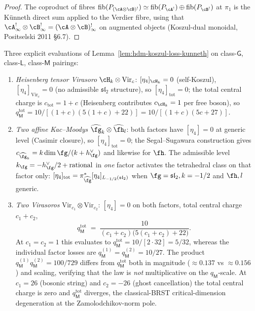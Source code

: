 \begin{proof}
The coproduct of fibres
$\mathrm{fib}(P_{(\cA\otimes\cB)^!}) \simeq
\mathrm{fib}(P_{\cA^!})\oplus\mathrm{fib}(P_{\cB^!})$ at $\pi_1$
is the K\"unneth direct sum applied to the Verdier fibre, using
that $\cA^!_\infty\otimes\cB^!_\infty = (\cA\otimes\cB)^!_\infty$
on augmented objects (Koszul-dual monoidal, Positselski
\textup{2011 §6.7}).
\end{proof}

\begin{example}
\label{ex:hdm-koszul-loss-kunneth-examples}
Three explicit evaluations of
Lemma~\ref{lem:hdm-koszul-loss-kunneth} on class-$\mathsf G$,
class-$\mathsf L$, class-$\mathsf M$ pairings:
\begin{enumerate}[label=\textup{(\roman*)}]
\item \emph{Heisenberg tensor Virasoro}
$\cH_k\otimes\mathrm{Vir}_c$: $[\eta_4]_{\cH_k}=0$ (self-Koszul),
$[\eta_4]_{\mathrm{Vir}_c}=0$ (no admissible $\mathfrak{sl}_2$
structure), so $[\eta_4]_{\mathrm{tot}}=0$; the total central
charge is $c_{\mathrm{tot}} = 1+c$ (Heisenberg contributes
$c_{\cH_k}=1$ per free boson), so $q_\mathsf{M}^{\mathrm{tot}} =
10/[(1+c)(5(1+c)+22)] = 10/[(1+c)(5c+27)]$.
\item \emph{Two affine Kac--Moodys}
$\widehat\fg_k\otimes\widehat\fh_l$: both factors have
$[\eta_4]=0$ at generic level (Casimir closure), so
$[\eta_4]_{\mathrm{tot}}=0$; the Segal--Sugawara construction
gives $c_{\widehat\fg_k} = k\dim\fg/(k+h^\vee_\fg)$ and
likewise for $\fh$. The admissible level $k_\fg = -h^\vee_\fg/2 +
\mathrm{rational}$ in \emph{one} factor activates the tetrahedral
class on that factor only: $[\eta_4]_{\mathrm{tot}} =
\pi_{\widehat\fg}^\ast[\eta_4]_{L_{-1/2}(\mathfrak{sl}_2)}$ when
$\fg=\mathfrak{sl}_2,k=-1/2$ and $\fh,l$ generic.
\item \emph{Two Virasoros}
$\mathrm{Vir}_{c_1}\otimes\mathrm{Vir}_{c_2}$: $[\eta_4]=0$ on both
factors, total central charge $c_1+c_2$,
\[
q_\mathsf{M}^{\mathrm{tot}}\;=\;
\frac{10}{(c_1+c_2)\bigl(5(c_1+c_2)+22\bigr)}.
\]
At $c_1=c_2=1$ this evaluates to $q_\mathsf{M}^{\mathrm{tot}} =
10/[2\cdot 32] = 5/32$, whereas the individual factor losses are
$q_\mathsf{M}^{(1)}=q_\mathsf{M}^{(2)}=10/27$. The product
$q_\mathsf{M}^{(1)} q_\mathsf{M}^{(2)} = 100/729$ differs from
$q_\mathsf{M}^{\mathrm{tot}}$ both in magnitude ($\approx 0.137$
vs $\approx 0.156$) and scaling, verifying that the law is
\emph{not} multiplicative on the $q_\mathsf{M}$-scale. At $c_1=26$
(bosonic string) and $c_2=-26$ (ghost cancellation) the total
central charge is zero and $q_\mathsf{M}^{\mathrm{tot}}$ diverges,
the classical-BRST critical-dimension degeneration at the
Zamolodchikov-norm pole.
\end{enumerate}
\end{example}

